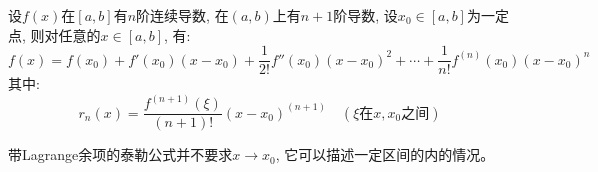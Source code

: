 \begin{theorem}[带Lagrange余项的泰勒公式]
    设$f(x)$在$[a, b]$有$n$阶连续导数, 在$(a, b)$上有$n+1$阶导数, 设$x_0 \in [a, b]$为一定点, 则对任意的$x \in [a, b]$, 有:
    \begin{equation*}
        f(x) = f(x_0) + f'(x_0)(x-x_0) + \frac{1}{2!}f''(x_0)(x-x_0)^2+\cdots+\frac{1}{n!}f^{(n)}(x_0)(x-x_0)^n
    \end{equation*}
    其中:
    \begin{equation*}
        r_n(x) = \frac{f^{(n+1)}(\xi)}{(n+1)!}(x-x_0)^{(n+1)} \quad (\xi\text{在}x, x_0\text{之间} )
    \end{equation*}
\end{theorem}
\begin{remark}
    带Lagrange余项的泰勒公式并不要求$x \to x_0$, 它可以描述一定区间的内的情况。
\end{remark}

